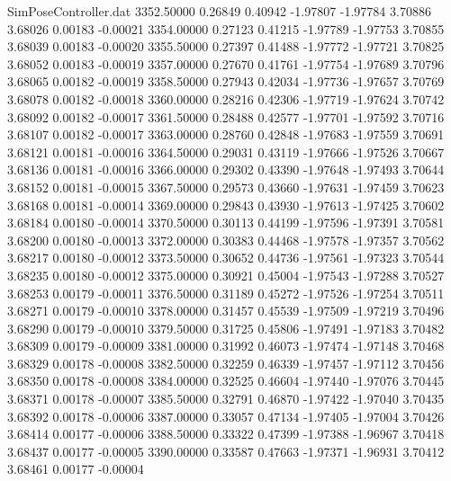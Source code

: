 \begin{filecontents}{SimPoseController.dat}
3352.50000    0.26849    0.40942    -1.97807   -1.97784    3.70886    3.68026    0.00183   -0.00021
3354.00000    0.27123    0.41215    -1.97789   -1.97753    3.70855    3.68039    0.00183   -0.00020
3355.50000    0.27397    0.41488    -1.97772   -1.97721    3.70825    3.68052    0.00183   -0.00019
3357.00000    0.27670    0.41761    -1.97754   -1.97689    3.70796    3.68065    0.00182   -0.00019
3358.50000    0.27943    0.42034    -1.97736   -1.97657    3.70769    3.68078    0.00182   -0.00018
3360.00000    0.28216    0.42306    -1.97719   -1.97624    3.70742    3.68092    0.00182   -0.00017
3361.50000    0.28488    0.42577    -1.97701   -1.97592    3.70716    3.68107    0.00182   -0.00017
3363.00000    0.28760    0.42848    -1.97683   -1.97559    3.70691    3.68121    0.00181   -0.00016
3364.50000    0.29031    0.43119    -1.97666   -1.97526    3.70667    3.68136    0.00181   -0.00016
3366.00000    0.29302    0.43390    -1.97648   -1.97493    3.70644    3.68152    0.00181   -0.00015
3367.50000    0.29573    0.43660    -1.97631   -1.97459    3.70623    3.68168    0.00181   -0.00014
3369.00000    0.29843    0.43930    -1.97613   -1.97425    3.70602    3.68184    0.00180   -0.00014
3370.50000    0.30113    0.44199    -1.97596   -1.97391    3.70581    3.68200    0.00180   -0.00013
3372.00000    0.30383    0.44468    -1.97578   -1.97357    3.70562    3.68217    0.00180   -0.00012
3373.50000    0.30652    0.44736    -1.97561   -1.97323    3.70544    3.68235    0.00180   -0.00012
3375.00000    0.30921    0.45004    -1.97543   -1.97288    3.70527    3.68253    0.00179   -0.00011
3376.50000    0.31189    0.45272    -1.97526   -1.97254    3.70511    3.68271    0.00179   -0.00010
3378.00000    0.31457    0.45539    -1.97509   -1.97219    3.70496    3.68290    0.00179   -0.00010
3379.50000    0.31725    0.45806    -1.97491   -1.97183    3.70482    3.68309    0.00179   -0.00009
3381.00000    0.31992    0.46073    -1.97474   -1.97148    3.70468    3.68329    0.00178   -0.00008
3382.50000    0.32259    0.46339    -1.97457   -1.97112    3.70456    3.68350    0.00178   -0.00008
3384.00000    0.32525    0.46604    -1.97440   -1.97076    3.70445    3.68371    0.00178   -0.00007
3385.50000    0.32791    0.46870    -1.97422   -1.97040    3.70435    3.68392    0.00178   -0.00006
3387.00000    0.33057    0.47134    -1.97405   -1.97004    3.70426    3.68414    0.00177   -0.00006
3388.50000    0.33322    0.47399    -1.97388   -1.96967    3.70418    3.68437    0.00177   -0.00005
3390.00000    0.33587    0.47663    -1.97371   -1.96931    3.70412    3.68461    0.00177   -0.00004

\end{filecontents}
